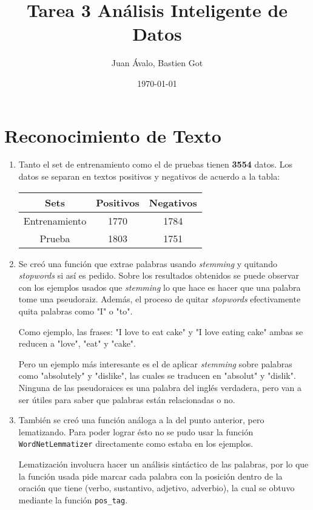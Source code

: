 \documentclass[11pt,letterpaper]{article}
\author{Juan Ávalo, Bastien Got}
\date{\today}
\title{Tarea 3 Análisis Inteligente de Datos}
\begin{document}
\maketitle
\tableofcontents


\section{Reconocimiento de Texto}
\label{sec:orgheadline1}

\begin{enumerate}
\item Tanto el set de entrenamiento como el de pruebas tienen \textbf{3554} datos.
Los datos se separan en textos positivos y negativos de acuerdo a la tabla:
\begin{center}
\begin{tabular}{|c|c|c|}
\hline
Sets & Positivos & Negativos\\
\hline
Entrenamiento & 1770 & 1784\\
Prueba & 1803 & 1751\\
\hline
\end{tabular}
\end{center}
\item Se creó una función que extrae palabras usando \emph{stemming} y quitando
\emph{stopwords} si así es pedido. Sobre los resultados obtenidos se puede
observar con los ejemplos usados que \emph{stemming} lo que hace es hacer que
una palabra tome una pseudoraiz. Además, el proceso de quitar \emph{stopwords}
efectivamente quita palabras como "I" o "to".

Como ejemplo, las frases: "I love to eat cake" y "I love eating cake" ambas
se reducen a "love", "eat" y "cake".

Pero un ejemplo más interesante es el de aplicar \emph{stemming} sobre palabras
como "absolutely" y "dislike", las cuales se traducen en "absolut" y
"dislik". Ninguna de las pseudoraices es una palabra del inglés verdadera,
pero van a ser útiles para saber que palabras están relacionadas o no.
\item También se creó una función análoga a la del punto anterior, pero
lematizando. Para poder lograr ésto no se pudo usar la función
\texttt{WordNetLemmatizer} directamente como estaba en los ejemplos.

Lematización involucra hacer un análisis sintáctico de las palabras, por lo
que la función usada pide marcar cada palabra con la posición dentro de la
oración que tiene (verbo, sustantivo, adjetivo, adverbio), la cual se
obtuvo mediante la función \texttt{pos\_tag}.


\end{enumerate}
\end{document}

